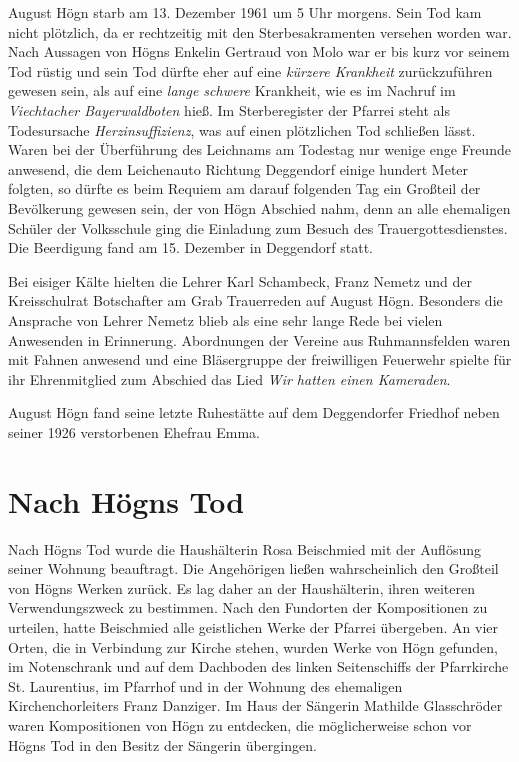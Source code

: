 \documentclass{book}
\newcommand{\zitat}[1]{\textit{#1}}
\begin{document}
August Högn starb am 13. Dezember 1961 um 5 Uhr morgens. Sein Tod kam
nicht plötzlich, da er rechtzeitig mit den Sterbesakramenten versehen
worden war. Nach Aussagen von Högns Enkelin Gertraud von Molo war er
bis kurz vor seinem Tod rüstig und sein Tod dürfte eher auf eine
\zitat{\textup{kürzere Krankheit}} zurückzuführen gewesen
sein, als auf eine \zitat{lange schwere} Krankheit, wie es im
Nachruf im \textit{Viechtacher Bayerwaldboten} hieß. Im Sterberegister
der Pfarrei steht als Todesursache \textit{Herzinsuffizienz}, was auf
einen plötzlichen Tod schließen lässt. Waren bei der Überführung des
Leichnams am Todestag nur wenige enge Freunde anwesend, die dem
Leichenauto Richtung Deggendorf einige hundert Meter folgten, so dürfte
es beim Requiem am darauf folgenden Tag ein Großteil der Bevölkerung
gewesen sein, der von Högn Abschied nahm, denn an alle ehemaligen
Schüler der Volksschule ging die Einladung zum Besuch des
Trauergottesdienstes. Die Beerdigung fand am 15. Dezember in Deggendorf
statt.

Bei eisiger Kälte hielten die Lehrer Karl Schambeck, Franz Nemetz und
der Kreisschulrat Botschafter am Grab Trauerreden auf August Högn.
Besonders die Ansprache von Lehrer Nemetz blieb als eine sehr lange
Rede bei vielen Anwesenden in Erinnerung. Abordnungen der Vereine aus
Ruhmannsfelden waren mit Fahnen anwesend und eine Bläsergruppe der
freiwilligen Feuerwehr spielte für ihr Ehrenmitglied zum Abschied das
Lied \textit{Wir hatten einen Kameraden}.

August Högn fand seine letzte Ruhestätte auf dem Deggendorfer Friedhof
neben seiner 1926 verstorbenen Ehefrau Emma.

\section{Nach Högns Tod}
Nach Högns Tod wurde die Haushälterin Rosa Beischmied mit der Auflösung
seiner Wohnung beauftragt. Die Angehörigen ließen wahrscheinlich den
Großteil von Högns Werken zurück. Es lag daher an der Haushälterin,
ihren weiteren Verwendungszweck zu bestimmen. Nach den Fundorten der
Kompositionen zu urteilen, hatte Beischmied alle geistlichen Werke
der Pfarrei übergeben. An vier Orten, die in Verbindung zur Kirche
stehen, wurden Werke von Högn gefunden, im Notenschrank und auf dem
Dachboden des linken Seitenschiffs der Pfarrkirche St. Laurentius, im
Pfarrhof und in der Wohnung des ehemaligen Kirchenchorleiters Franz
Danziger. Im Haus der Sängerin Mathilde Glasschröder waren
Kompositionen von Högn zu entdecken, die möglicherweise schon vor Högns
Tod in den Besitz der Sängerin übergingen.
\end{document}
